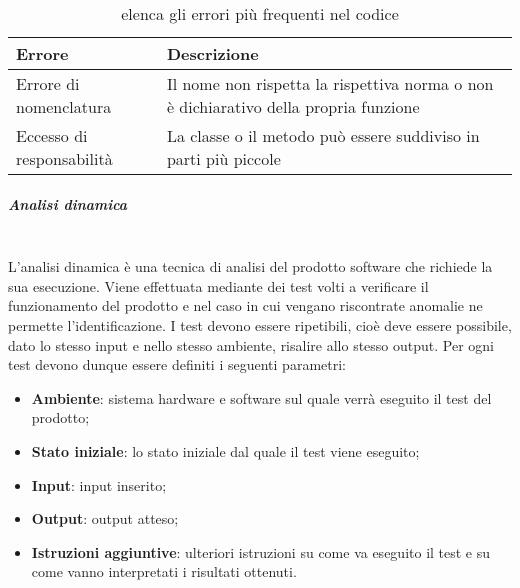 				\begin{table}[!h]
					\centering
					\begin{tabular}{|l|l|}
						\hline
					\textbf{Errore} & \textbf{Descrizione}\\
					\hline
					Errore di nomenclatura & Il nome non rispetta la rispettiva norma o non è dichiarativo della propria funzione\\
					\hline
					Eccesso di responsabilità & La classe o il metodo può essere suddiviso in parti più piccole\\
					\hline			
					\end{tabular}
					\caption{elenca gli errori più frequenti nel codice}
					\label{Tabella 2:}
				\end{table}
														
				\subparagraph{Analisi dinamica} \mbox{}\\
				L’analisi dinamica è una tecnica di analisi del prodotto software che richiede la sua	esecuzione.	Viene effettuata mediante dei test volti a verificare il funzionamento del prodotto e nel caso in cui vengano riscontrate anomalie ne permette l’identificazione. I test devono essere ripetibili, cioè deve essere possibile, dato lo stesso input e nello stesso ambiente, risalire allo stesso output. Per ogni test devono dunque essere definiti i seguenti parametri:
				\begin{itemize}
					\item \textbf{Ambiente}: sistema hardware e software sul quale verrà eseguito il test del prodotto;
					\item \textbf{Stato iniziale}: lo stato iniziale dal quale il test viene eseguito;
					\item \textbf{Input}: input inserito;
					\item \textbf{Output}: output atteso;
					\item \textbf{Istruzioni aggiuntive}: ulteriori istruzioni su come va eseguito il test e su come vanno interpretati i risultati ottenuti.
				\end{itemize}
